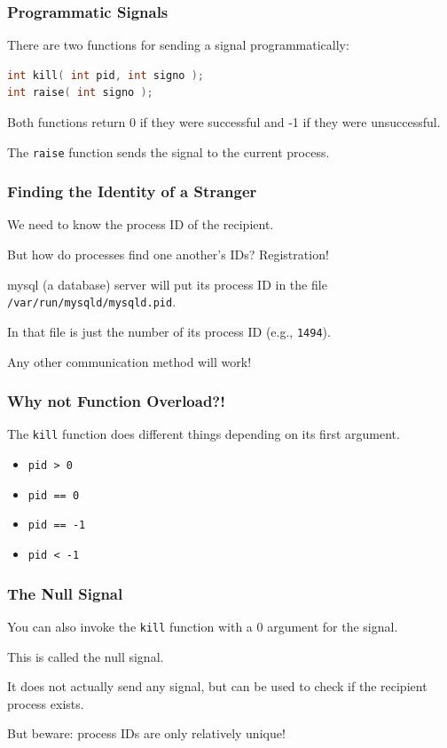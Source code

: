 \begin{frame}[fragile]
	\frametitle{Programmatic Signals}

	There are two functions for sending a signal programmatically:

	\begin{lstlisting}[language=C]
int kill( int pid, int signo );
int raise( int signo );
\end{lstlisting}

	Both functions return 0 if they were successful and -1 if they were unsuccessful.

	The \texttt{raise} function sends the signal to the current process.

\end{frame}


\begin{frame}
	\frametitle{Finding the Identity of a Stranger}

	We need to know the process ID of the recipient.

	But how do processes find one another's IDs? Registration!

	mysql (a database) server will put its process ID in the file \texttt{/var/run/mysqld/mysqld.pid}.

	In that file is just the number of its process ID (e.g., \texttt{1494}).

	Any other communication method will work!

\end{frame}


\begin{frame}
	\frametitle{Why not Function Overload?!}

	The \texttt{kill} function does different things depending on its first argument.

	\begin{itemize}
		\item \texttt{pid > 0}
		\item \texttt{pid == 0}
		\item \texttt{pid == -1}
		\item \texttt{pid < -1}
	\end{itemize}

\end{frame}

\begin{frame}
	\frametitle{The Null Signal}

	You can also invoke the \texttt{kill} function with a 0 argument for the signal.

	This is called the \alert{null signal}.

	It does not actually send any signal, but can be used to check if the recipient process exists.

	But beware: process IDs are only relatively unique!

\end{frame}


